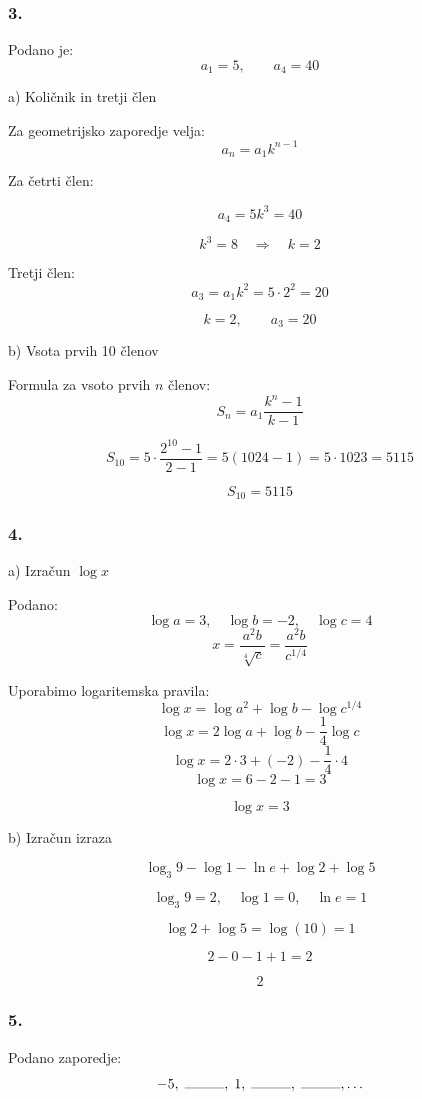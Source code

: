 \documentclass[a4paper,12pt]{letter}
\begin{document}
\subsubsection{3.}


Podano je:
$$
a_1=5,\qquad a_4=40
$$

a) Količnik in tretji člen

Za geometrijsko zaporedje velja:
$$
a_n=a_1 k^{n-1}
$$

Za četrti člen:

$$
a_4=5k^3=40
$$

$$
k^3=8 \quad\Rightarrow\quad k=2
$$

Tretji člen:
$$
a_3=a_1 k^2=5\cdot 2^2=20
$$

$$
\boxed{k=2,\qquad a_3=20}
$$

 b) Vsota prvih 10 členov

Formula za vsoto prvih $n$ členov:
$$
S_n=a_1\frac{k^n-1}{k-1}
$$

$$
S_{10}=5\cdot\frac{2^{10}-1}{2-1}=5(1024-1)=5\cdot1023=5115
$$

$$
\boxed{S_{10}=5115}
$$

\subsubsection{4.}

a) Izračun $\log x$

Podano:
$$
\log a=3,\quad \log b=-2,\quad \log c=4
$$
$$
x=\frac{a^2 b}{\sqrt[4]{c}}=\frac{a^2 b}{c^{1/4}}
$$

Uporabimo logaritemska pravila:
$$
\log x=\log a^2+\log b-\log c^{1/4}
$$
$$
\log x=2\log a+\log b-\frac14\log c
$$
$$
\log x=2\cdot3+(-2)-\frac14\cdot4
$$
$$
\log x=6-2-1=3
$$

$$
\boxed{\log x=3}
$$

b) Izračun izraza

$$
\log_3 9-\log 1-\ln e+\log 2+\log 5
$$

$$
\log_3 9=2,\quad \log 1=0,\quad \ln e=1
$$

$$
\log 2+\log 5=\log(10)=1
$$

$$
2-0-1+1=2
$$

$$
\boxed{2}
$$

\subsubsection{5.}

Podano zaporedje:
$$
-5,\;\rule{1cm}{0.1mm},\;1,\;\rule{1cm}{0.1mm},\;\rule{1cm}{0.1mm},\ldots
$$
\end{document}
